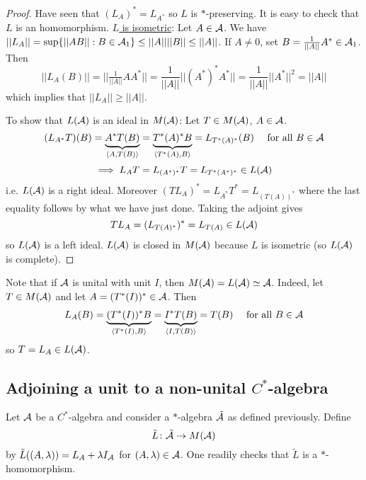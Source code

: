 \documentclass[10pt,english,a4paper]{article}
\theoremstyle{definition}
\begin{document}
\begin{proof}
    
Have seen that $(L_A)^* = L_{A^*}$ so $L$ is $*$-preserving. It is easy to 
check that $L$ is an homomorphism. \ul{$L$ is isometric}: Let $A \in \mathcal{A}$.
We have $||L_A|| = \sup \{ ||AB|| : B \in \mathcal{A}_1  \} \leq ||A||||B|| \leq ||A||$.
If $A \neq 0$, set $B = \tfrac{1}{||A||}A^* \in \mathcal{A}_1$. Then 
\[
||L_A(B)|| = ||\tfrac{1}{||A||}AA^*|| = \frac{1}{||A||} ||(A^*)^*A^*|| = \frac{1}{||A||}
||A^*||^2 = ||A||
\]
which implies that $||L_A|| \geq ||A||$.

To show that $L(\mathcal{A})$ is an ideal in $M(\mathcal{A})$: Let $T \in M(\mathcal{A})$, $A \in \mathcal{A}$.
\[ 
(L_{A^*}T)(B) = \underbrace{A^*T(B)}_{\left\langle A,T(B) \right\rangle} = \underbrace{T^*(A)^*B}_{\left\langle T^*(A), B \right\rangle} = L_{T^*(A)^*} (B) \quad \text{ for all }B \in \mathcal{A}
\]
\[\implies L_A T = L_{(A^*)^*} T = L_{T^*(A^*)^*} \in L(\mathcal{A})   \]
i.e. $L(\mathcal{A})$ is a right ideal. Moreover $(TL_A)^* = L_{A^*}T^* = L_{(T(A))^*}$
where the last equality follows by what we have just done. 
Taking the adjoint gives
\[ TL_A = (L_{T(A)^*})^* = L_{T(A)}  \in L(\mathcal{A}) \]
so $L(\mathcal{A})$ is a left ideal. $L(\mathcal{A})$ is closed in $M(\mathcal{A})$ because $L$ is isometric 
(so $L(\mathcal{A})$ is complete).
\end{proof}

Note that if $\mathcal{A}$ is unital with unit $I$, then $M(\mathcal{A})= L(\mathcal{A}) \simeq \mathcal{A}$.
Indeed, let $T \in M(\mathcal{A})$ and let $A = (T^*(I))^* \in \mathcal{A}$. Then 
\begin{align*}
    L_{A}(B) = \underbrace{(T^*(I))^*B}_{\left\langle T^*(I), B \right\rangle} = \underbrace{I^*
T(B)}_{\left\langle I,T(B) \right\rangle}= T(B) \quad \text{ for all } B \in \mathcal{A}
\end{align*}
so $T = L_{A} \in L(\mathcal{A})$.

\subsection{Adjoining a unit to a non-unital $C^*$-algebra}
Let $\mathcal{A}$ be a $C^*$-algebra and consider a $*$-algebra $\tilde{\mathcal{A}}$ as 
defined previously. Define 
\[ \tilde{L}\colon \tilde{\mathcal{A}} \to M(\mathcal{A}) \]
by $\tilde{L}((A,\lambda)) = L_A + \lambda I_{\mathcal{A}}$ for $(A,\lambda) \in \mathcal{A}$.
One readily checks that $\tilde{L}$ is a $*$-homomorphism.
\end{document}
